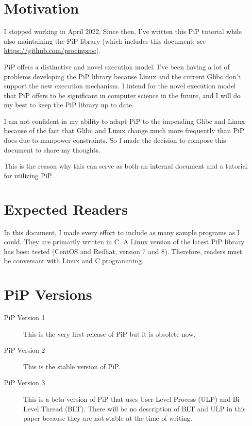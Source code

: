 
\section*{Motivation}

I stopped working in April 2022. Since then, I've written this PiP
tutorial while also maintaining the PiP library (which includes this
document; see \url{https://github.com/procinproc}).

PiP offers a distinctive and novel execution model. I've been having a
lot of problems developing the PiP library because Linux and the
current Glibc don't support the new execution mechanism. I intend for
the novel execution model that PiP offers to be significant in
computer science in the future, and I will do my best to keep the PiP
library up to date.

I am not confident in my ability to adapt PiP to the impending Glibc
and Linux because of the fact that Glibc and Linux change much more
frequently than PiP does due to manpower constraints. So I made the
decision to compose this document to share my thoughts.

This is the reason why this can serve as both an internal document and
a tutorial for utilizing PiP.

\section*{Expected Readers}

In this document, I made every effort to include as many sample
programs as I could. They are primarily written in C. A Linux version
of the latest PiP library has been tested (CentOS and Redhat, version
7 and 8). Therefore, readers must be conversant with Linux and C
programming. 

\section*{PiP Versions}

\begin{description}
\item[PiP Version 1]
  This is the very first release of PiP but it is obsolete now.
\item[PiP Version 2]
  This is the stable version of PiP.
\item[PiP Version 3]
  This is a beta version of PiP that uses User-Level Process (ULP) and
  Bi-Level Thread (BLT). There will be no description of BLT and
  ULP in this paper because they are not stable at the time of writing.
\end{description}

